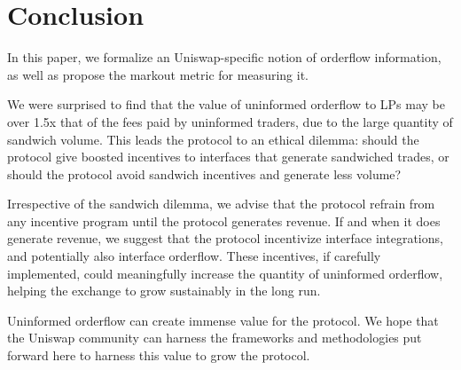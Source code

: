 \section{Conclusion} \label{section:conclusion}
    In this paper, we formalize an Uniswap-specific notion of orderflow information, as well as propose the markout metric for measuring it. 

    We were surprised to find that the value of uninformed orderflow to LPs may be over 1.5x that of the fees paid by uninformed traders, due to the large quantity of sandwich volume. This leads the protocol to an ethical dilemma: should the protocol give boosted incentives to interfaces that generate sandwiched trades, or should the protocol avoid sandwich incentives and generate less volume?

    Irrespective of the sandwich dilemma, we advise that the protocol refrain from any incentive program until the protocol generates revenue. If and when it does generate revenue, we suggest that the protocol incentivize interface integrations, and potentially also interface orderflow. These incentives, if carefully implemented, could meaningfully increase the quantity of uninformed orderflow, helping the exchange to grow sustainably in the long run.
    

    Uninformed orderflow can create immense value for the protocol. We hope that the Uniswap community can harness the frameworks and methodologies put forward here to harness this value to grow the protocol.